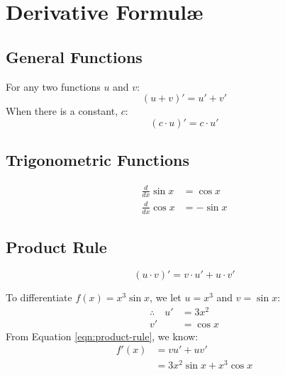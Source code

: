 \documentclass[../main.tex]{subfiles}
\begin{document}
\chapter{Derivative Formulæ}
\section{General Functions}
For any two functions $u$ and $v$:
\[ (u + v)' = u' + v' \]
When there is a constant, $c$:
\[ (c \cdot u)' = c \cdot u' \]
\section{Trigonometric Functions}
\begin{align*}
    \frac{d}{dx} \sin x &= \cos x\\
    \frac{d}{dx} \cos x &= - \sin x
\end{align*}
\section{Product Rule}
\begin{equation}
    (u \cdot v)' = v \cdot u' + u \cdot v'
    \label{eqn:product-rule}
\end{equation}
\begin{exmp}
    To differentiate $f(x) = x^3 \sin x$, we let 
    $u = x^3$ and $v = \sin x$:
    \begin{align*}
        \therefore\quad u' &= 3x^2\\
                        v' &= \cos x
    \end{align*}
    From Equation \ref{eqn:product-rule}, we know:
    \begin{align*}
        f'(x)   &= vu' + uv'\\
                &= 3x^2 \sin x + x^3 \cos x
    \end{align*}
\end{exmp}
\end{document}
